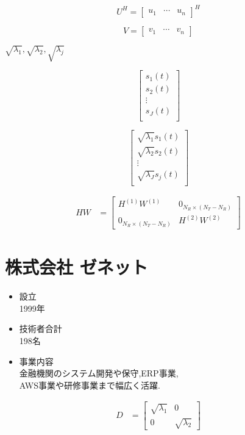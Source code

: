 \documentclass{ltjsarticle}
\begin{document}
\begin{equation*}
  U^H =
  \begin{bmatrix}
    u_1 & \cdots & u_n
  \end{bmatrix}^H
\end{equation*}

\begin{equation*}
  V =
  \begin{bmatrix}
    v_1 & \cdots & v_n
  \end{bmatrix}
\end{equation*}

$\sqrt{\lambda_1},\sqrt{\lambda_2},\sqrt{\lambda_j}$

\begin{equation*}
  \begin{bmatrix}
    s_1(t)\\
    s_2(t)\\
    \vdots\\
    s_J(t)\\
  \end{bmatrix}
\end{equation*}

\begin{equation*}
  \begin{bmatrix}
    \sqrt{\lambda_1}s_1(t)\\
    \sqrt{\lambda_2}s_2(t)\\
    \vdots\\
    \sqrt{\lambda_J}s_j(t)\\
  \end{bmatrix}
\end{equation*}

\begin{align*}
  HW &=
    \begin{bmatrix}
      H^{(1)}W^{(1)} & 0_{N_R \times (N_T - N_R)}\\
      0_{N_R \times (N_T - N_R)} & H^{(2)}W^{(2)}
    \end{bmatrix}
\end{align*}

\section*{株式会社 ゼネット}
\begin{itemize}
  \item 設立\\1999年
  \item 技術者合計\\198名
  \item 事業内容\\金融機関のシステム開発や保守,ERP事業,\\AWS事業や研修事業まで幅広く活躍.
\end{itemize}

\begin{align*}
  D &=
  \begin{bmatrix}
    \sqrt{\lambda_1} & 0\\
    0 & \sqrt{\lambda_2}
  \end{bmatrix}
\end{align*}
\end{document}
